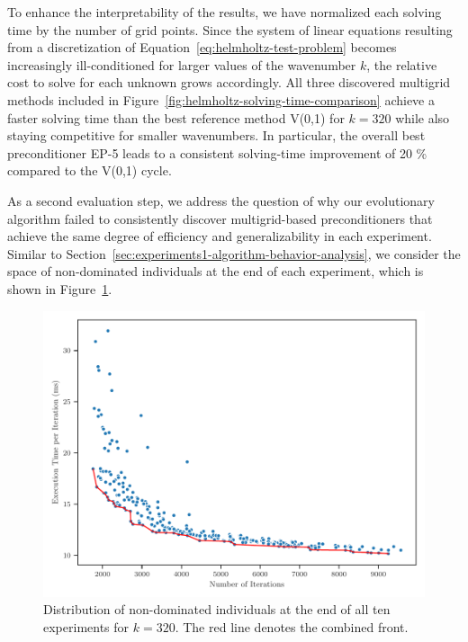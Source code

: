 To enhance the interpretability of the results, we have normalized each solving time by the number of grid points.
Since the system of linear equations resulting from a discretization of Equation~\ref{eq:helmholtz-test-problem} becomes increasingly ill-conditioned for larger values of the wavenumber $k$, the relative cost to solve for each unknown grows accordingly.
All three discovered multigrid methods included in Figure~\ref{fig:helmholtz-solving-time-comparison} achieve a faster solving time than the best reference method V(0,1) for $k = 320$ while also staying competitive for smaller wavenumbers.
In particular, the overall best preconditioner EP-5 leads to a consistent solving-time improvement of 20 \% compared to the V(0,1) cycle.

As a second evaluation step, we address the question of why our evolutionary algorithm failed to consistently discover multigrid-based preconditioners that achieve the same degree of efficiency and generalizability in each experiment.
Similar to Section~\ref{sec:experiments1-algorithm-behavior-analysis}, we consider the space of non-dominated individuals at the end of each experiment, which is shown in Figure~\ref{fig:pareto-front-helmholtz}.
\begin{figure}
\centering
	\includegraphics[scale=0.725]{figures/pareto-front.pdf}
	\caption[2D Helmholtz -- Distribution of non-dominated individuals at the end of all ten experiments]{Distribution of non-dominated individuals at the end of all ten experiments for $k = 320$. The red line denotes the combined front.}
	\label{fig:pareto-front-helmholtz}
\end{figure}
